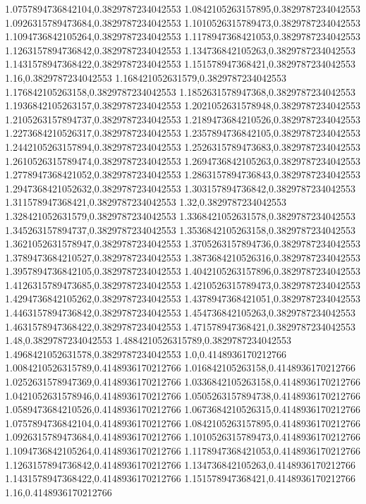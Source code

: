 1.0757894736842104,0.3829787234042553
1.0842105263157895,0.3829787234042553
1.0926315789473684,0.3829787234042553
1.1010526315789473,0.3829787234042553
1.1094736842105264,0.3829787234042553
1.1178947368421053,0.3829787234042553
1.1263157894736842,0.3829787234042553
1.134736842105263,0.3829787234042553
1.1431578947368422,0.3829787234042553
1.151578947368421,0.3829787234042553
1.16,0.3829787234042553
1.168421052631579,0.3829787234042553
1.176842105263158,0.3829787234042553
1.1852631578947368,0.3829787234042553
1.1936842105263157,0.3829787234042553
1.2021052631578948,0.3829787234042553
1.2105263157894737,0.3829787234042553
1.2189473684210526,0.3829787234042553
1.2273684210526317,0.3829787234042553
1.2357894736842105,0.3829787234042553
1.2442105263157894,0.3829787234042553
1.2526315789473683,0.3829787234042553
1.2610526315789474,0.3829787234042553
1.2694736842105263,0.3829787234042553
1.2778947368421052,0.3829787234042553
1.2863157894736843,0.3829787234042553
1.2947368421052632,0.3829787234042553
1.303157894736842,0.3829787234042553
1.311578947368421,0.3829787234042553
1.32,0.3829787234042553
1.328421052631579,0.3829787234042553
1.3368421052631578,0.3829787234042553
1.345263157894737,0.3829787234042553
1.3536842105263158,0.3829787234042553
1.3621052631578947,0.3829787234042553
1.3705263157894736,0.3829787234042553
1.3789473684210527,0.3829787234042553
1.3873684210526316,0.3829787234042553
1.3957894736842105,0.3829787234042553
1.4042105263157896,0.3829787234042553
1.4126315789473685,0.3829787234042553
1.4210526315789473,0.3829787234042553
1.4294736842105262,0.3829787234042553
1.4378947368421051,0.3829787234042553
1.4463157894736842,0.3829787234042553
1.454736842105263,0.3829787234042553
1.4631578947368422,0.3829787234042553
1.471578947368421,0.3829787234042553
1.48,0.3829787234042553
1.4884210526315789,0.3829787234042553
1.4968421052631578,0.3829787234042553
1.0,0.4148936170212766
1.0084210526315789,0.4148936170212766
1.016842105263158,0.4148936170212766
1.0252631578947369,0.4148936170212766
1.0336842105263158,0.4148936170212766
1.0421052631578946,0.4148936170212766
1.0505263157894738,0.4148936170212766
1.0589473684210526,0.4148936170212766
1.0673684210526315,0.4148936170212766
1.0757894736842104,0.4148936170212766
1.0842105263157895,0.4148936170212766
1.0926315789473684,0.4148936170212766
1.1010526315789473,0.4148936170212766
1.1094736842105264,0.4148936170212766
1.1178947368421053,0.4148936170212766
1.1263157894736842,0.4148936170212766
1.134736842105263,0.4148936170212766
1.1431578947368422,0.4148936170212766
1.151578947368421,0.4148936170212766
1.16,0.4148936170212766
